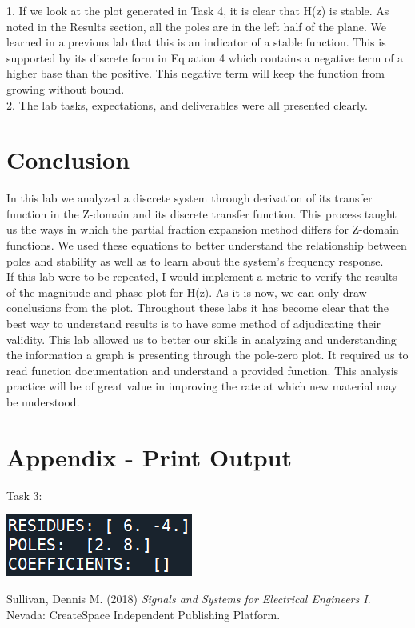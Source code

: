 \documentclass[12pt]{report}
\begin{document}
1. If we look at the plot generated in Task 4, it is clear that H(z) is stable. As noted in the Results section, all the poles are in the left half of the plane. We learned in a previous lab that this is an indicator of a stable function. This is supported by its discrete form in Equation 4 which contains a negative term of a higher base than the positive. This negative term will keep the function from growing without bound. \\

2. The lab tasks, expectations, and deliverables were all presented clearly. \\

\section{Conclusion}

In this lab we analyzed a discrete system through derivation of its transfer function in the Z-domain and its discrete transfer function. This process taught us the ways in which the partial fraction expansion method differs for Z-domain functions. We used these equations to better understand the relationship between poles and stability as well as to learn about the system's frequency response. \\

If this lab were to be repeated, I would implement a metric to verify the results of the magnitude and phase plot for H(z). As it is now, we can only draw conclusions from the plot. Throughout these labs it has become clear that the best way to understand results is to have some method of adjudicating their validity. This lab allowed us to better our skills in analyzing and understanding the information a graph is presenting through the pole-zero plot. It required us to read function documentation and understand a provided function. This analysis practice will be of great value in improving the rate at which new material may be understood. \\

\newpage
\appendix
\section*{Appendix - Print Output}

Task 3:
\begin{center}
	\includegraphics[scale = 1.5]{Lab 11 - Print Output/Task3.png}\\[1.0 cm]
\end{center}

\newpage
\begin{thebibliography}{111}
	
	Sullivan, Dennis M. (2018) {\it  Signals and Systems for Electrical Engineers I}. Nevada: CreateSpace Independent Publishing Platform.
	
\end{thebibliography}
\end{document}
